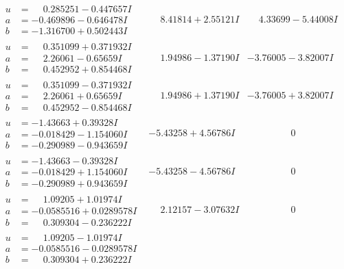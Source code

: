 \documentclass[1p]{elsarticle_modified}
\theoremstyle{definition}
\begin{document}
$$\begin{array}{c|c|c}
\begin{aligned}
u &= \phantom{-}0.285251 - 0.447657 I \\
a &= -0.469896 - 0.646478 I \\
b &= -1.316700 + 0.502443 I\end{aligned}
 & \phantom{-}8.41814 + 2.55121 I & \phantom{-}4.33699 - 5.44008 I \\ \hline\begin{aligned}
u &= \phantom{-}0.351099 + 0.371932 I \\
a &= \phantom{-}2.26061 - 0.65659 I \\
b &= \phantom{-}0.452952 + 0.854468 I\end{aligned}
 & \phantom{-}1.94986 - 1.37190 I & -3.76005 - 3.82007 I \\ \hline\begin{aligned}
u &= \phantom{-}0.351099 - 0.371932 I \\
a &= \phantom{-}2.26061 + 0.65659 I \\
b &= \phantom{-}0.452952 - 0.854468 I\end{aligned}
 & \phantom{-}1.94986 + 1.37190 I & -3.76005 + 3.82007 I \\ \hline\begin{aligned}
u &= -1.43663 + 0.39328 I \\
a &= -0.018429 - 1.154060 I \\
b &= -0.290989 - 0.943659 I\end{aligned}
 & -5.43258 + 4.56786 I & \phantom{-0.000000 } 0 \\ \hline\begin{aligned}
u &= -1.43663 - 0.39328 I \\
a &= -0.018429 + 1.154060 I \\
b &= -0.290989 + 0.943659 I\end{aligned}
 & -5.43258 - 4.56786 I & \phantom{-0.000000 } 0 \\ \hline\begin{aligned}
u &= \phantom{-}1.09205 + 1.01974 I \\
a &= -0.0585516 + 0.0289578 I \\
b &= \phantom{-}0.309304 - 0.236222 I\end{aligned}
 & \phantom{-}2.12157 - 3.07632 I & \phantom{-0.000000 } 0 \\ \hline\begin{aligned}
u &= \phantom{-}1.09205 - 1.01974 I \\
a &= -0.0585516 - 0.0289578 I \\
b &= \phantom{-}0.309304 + 0.236222 I\end{aligned}

\end{array}$$
\end{document}
